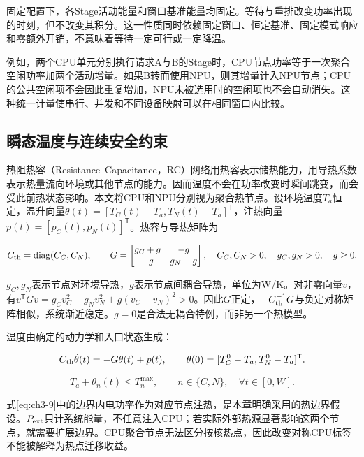 固定配置下，各Stage活动能量和窗口基准能量均固定。等待与重排改变功率出现的时刻，但不改变其积分。这一性质同时依赖固定窗口、恒定基准、固定模式响应和零额外开销，不意味着等待一定可行或一定降温。


例如，两个CPU单元分别执行请求A与B的Stage时，CPU节点功率等于一次聚合空闲功率加两个活动增量。如果B转而使用NPU，则其增量计入NPU节点；CPU的公共空闲项不会因此重复增加，NPU未被选用时的空闲项也不会自动消失。这种统一计量使串行、并发和不同设备映射可以在相同窗口内比较。

\subsection{瞬态温度与连续安全约束}

热阻热容（Resistance--Capacitance，RC）网络用热容表示储热能力，用导热系数表示热量流向环境或其他节点的能力。因而温度不会在功率改变时瞬间跳变，而会受此前热状态影响。本文将CPU和NPU分别视为聚合热节点。设环境温度\(T_a\)恒定，温升向量\(\theta(t)=[T_C(t)-T_a,T_N(t)-T_a]^{\mathsf T}\)，注热向量\(p(t)=[p_C(t),p_N(t)]^{\mathsf T}\)。热容与导热矩阵为

\begin{equation}
C_{\rm th}=\operatorname{diag}(C_C,C_N),\qquad
G=\begin{bmatrix}g_C+g&-g\\-g&g_N+g\end{bmatrix},
\quad C_C,C_N>0,\quad g_C,g_N>0,\quad g\ge0.
\label{eq:ch3-11}
\end{equation}

\(g_C,g_N\)表示节点对环境导热，\(g\)表示节点间耦合导热，单位为W/K。对非零向量\(v\)，有\(v^{\mathsf T}Gv=g_Cv_C^2+g_Nv_N^2+g(v_C-v_N)^2>0\)。因此\(G\)正定，\(-C_{\rm th}^{-1}G\)与负定对称矩阵相似，系统渐近稳定。\(g=0\)是合法无耦合特例，而非另一个热模型。

温度由确定的动力学和入口状态生成：

\begin{equation}
C_{\rm th}\dot\theta(t)=-G\theta(t)+p(t),\qquad
\theta(0)=[T_C^0-T_a,T_N^0-T_a]^{\mathsf T}.
\label{eq:ch3-12}
\end{equation}

\begin{equation}
T_a+\theta_n(t)\le T_n^{\max},\qquad n\in\{C,N\},\quad \forall t\in[0,W].
\label{eq:ch3-13}
\end{equation}

式\eqref{eq:ch3-9}中的边界内电功率作为对应节点注热，是本章明确采用的热边界假设。\(P_{\rm ext}\)只计系统能量，不任意注入CPU；若实际外部热源显著影响这两个节点，就需要扩展边界。CPU聚合节点无法区分按核热点，因此改变对称CPU标签不能被解释为热点迁移收益。

